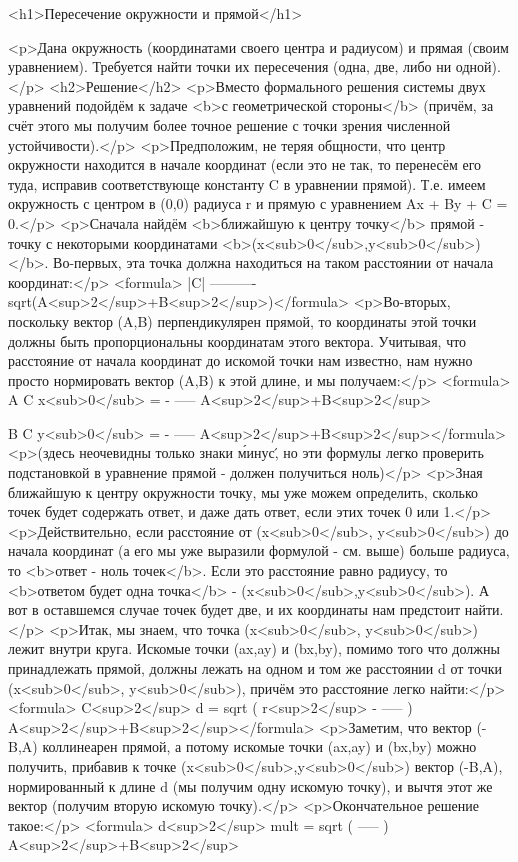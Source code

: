 <h1>Пересечение окружности и прямой</h1>

<p>Дана окружность (координатами своего центра и радиусом) и прямая (своим уравнением). Требуется найти точки их пересечения (одна, две, либо ни одной).</p>
<h2>Решение</h2>
<p>Вместо формального решения системы двух уравнений подойдём к задаче <b>с геометрической стороны</b> (причём, за счёт этого мы получим более точное решение с точки зрения численной устойчивости).</p>
<p>Предположим, не теряя общности, что центр окружности находится в начале координат (если это не так, то перенесём его туда, исправив соответствующе константу C в уравнении прямой). Т.е. имеем окружность с центром в (0,0) радиуса r и прямую с уравнением Ax + By + C = 0.</p>
<p>Сначала найдём <b>ближайшую к центру точку</b> прямой - точку с некоторыми координатами <b>(x<sub>0</sub>,y<sub>0</sub>)</b>. Во-первых, эта точка должна находиться на таком расстоянии от начала координат:</p>
<formula>    |C|
----------
sqrt(A<sup>2</sup>+B<sup>2</sup>)</formula>
<p>Во-вторых, поскольку вектор (A,B) перпендикулярен прямой, то координаты этой точки должны быть пропорциональны координатам этого вектора. Учитывая, что расстояние от начала координат до искомой точки нам известно, нам нужно просто нормировать вектор (A,B) к этой длине, и мы получаем:</p>
<formula>        A C
x<sub>0</sub> = - -----
       A<sup>2</sup>+B<sup>2</sup>

        B C
y<sub>0</sub> = - -----
       A<sup>2</sup>+B<sup>2</sup></formula>
<p>(здесь неочевидны только знаки \'минус\', но эти формулы легко проверить подстановкой в уравнение прямой - должен получиться ноль)</p>
<p>Зная ближайшую к центру окружности точку, мы уже можем определить, сколько точек будет содержать ответ, и даже дать ответ, если этих точек 0 или 1.</p>
<p>Действительно, если расстояние от (x<sub>0</sub>, y<sub>0</sub>) до начала координат (а его мы уже выразили формулой - см. выше) больше радиуса, то <b>ответ - ноль точек</b>. Если это расстояние равно радиусу, то <b>ответом будет одна точка</b> - (x<sub>0</sub>,y<sub>0</sub>). А вот в оставшемся случае точек будет две, и их координаты нам предстоит найти.</p>
<p>Итак, мы знаем, что точка (x<sub>0</sub>, y<sub>0</sub>) лежит внутри круга. Искомые точки (ax,ay) и (bx,by), помимо того что должны принадлежать прямой, должны лежать на одном и том же расстоянии d от точки (x<sub>0</sub>, y<sub>0</sub>), причём это расстояние легко найти:</p>
<formula>                  C<sup>2</sup>
d = sqrt ( r<sup>2</sup> - ----- )
                A<sup>2</sup>+B<sup>2</sup></formula>
<p>Заметим, что вектор (-B,A) коллинеарен прямой, а потому искомые точки (ax,ay) и (bx,by) можно получить, прибавив к точке (x<sub>0</sub>,y<sub>0</sub>) вектор (-B,A), нормированный к длине d (мы получим одну искомую точку), и вычтя этот же вектор (получим вторую искомую точку).</p>
<p>Окончательное решение такое:</p>
<formula>                d<sup>2</sup>
mult = sqrt ( ----- )
              A<sup>2</sup>+B<sup>2</sup>

